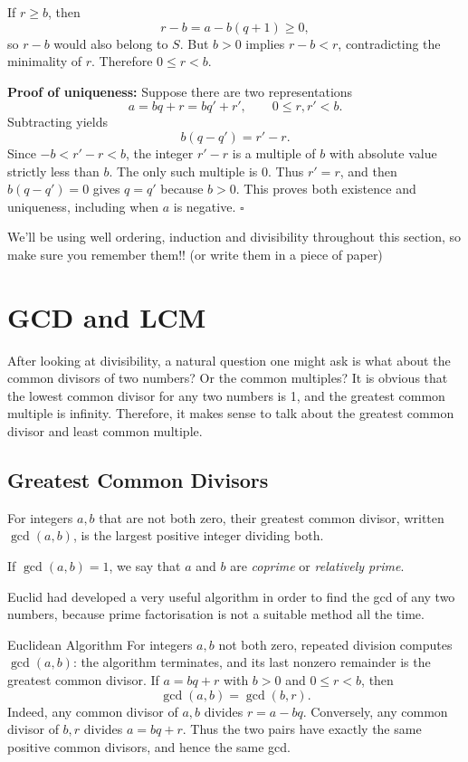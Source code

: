 \documentclass[a4paper,11pt,abstracton]{scrartcl}
\theoremstyle{dotlessP}
\theoremstyle{dotlessS}
\theoremstyle{remark}
\theoremstyle{definition}
\begin{document}
If $r\geq b$, then
\[
    r-b=a-b(q+1)\geq0,
\]
so $r-b$ would also belong to $S$. But $b>0$ implies $r-b<r$,
contradicting the minimality of $r$. Therefore $0\leq r<b$.


\textbf{Proof of uniqueness:}
Suppose there are two representations
\[
    a=bq+r=bq'+r',\qquad 0\leq r,r'<b.
\]
Subtracting yields
\[
    b(q-q')=r'-r.
\]
Since $-b<r'-r<b$, the integer $r'-r$ is a multiple of $b$ with
absolute value strictly less than $b$. The only such multiple is $0$.
Thus $r'=r$, and then $b(q-q')=0$ gives $q=q'$ because $b>0$.
This proves both existence and uniqueness, including when $a$ is negative.
\hfill$\square$

We'll be using well ordering, induction and divisibility throughout this section, so make sure you remember them!! (or write them in a piece of paper)

\section{GCD and LCM}

After looking at divisibility, a natural question one might ask is what about the common divisors of two numbers? Or the common multiples? It is obvious that the lowest common divisor for any two numbers is 1, and the greatest common multiple is infinity. Therefore, it makes sense to talk about the greatest common divisor and least common multiple.

\subsection{Greatest Common Divisors}

\begin{definition_box}
For integers $a,b$ that are not both zero, their greatest common divisor,
written $\gcd(a,b)$, is the largest positive integer dividing both.
\end{definition_box}

\begin{definition_box}
If $\gcd(a,b)=1$, we say that $a$ and $b$ are \emph{coprime} or \emph{relatively prime}.
\end{definition_box}

Euclid had developed a very useful algorithm in order to find the gcd of any two numbers, because prime factorisation is not a suitable method all the time.

\begin{mainbox}{Euclidean Algorithm}
For integers $a,b$ not both zero, repeated division computes
$\gcd(a,b)$: the algorithm terminates, and its last nonzero remainder
is the greatest common divisor.
\textit{}
If $a=bq+r$ with $b>0$ and $0\leq r<b$, then
\[
    \gcd(a,b)=\gcd(b,r).
\]
Indeed, any common divisor of $a,b$ divides $r=a-bq$. Conversely,
any common divisor of $b,r$ divides $a=bq+r$. Thus the two pairs
have exactly the same positive common divisors, and hence the same gcd.
\end{mainbox}
\end{document}
